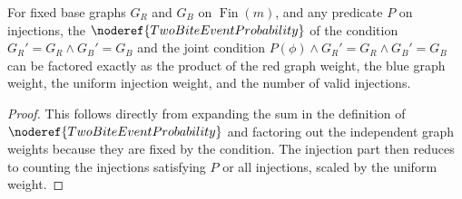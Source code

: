 \begin{helper}[TwoBiteFixedGraphsConditionalInjectionBridge]
\label{helper:TwoBiteFixedGraphsConditionalInjectionBridge}
For fixed base graphs \(G_R\) and \(G_B\) on \(\operatorname{Fin}(m)\), and any predicate \(P\) on injections, the \(\noderef{TwoBiteEventProbability}\) of the condition \(G_R'=G_R \land G_B'=G_B\) and the joint condition \(P(\phi) \land G_R'=G_R \land G_B'=G_B\) can be factored exactly as the product of the red graph weight, the blue graph weight, the uniform injection weight, and the number of valid injections.
\end{helper}

\begin{proof}
This follows directly from expanding the sum in the definition of \(\noderef{TwoBiteEventProbability}\) and factoring out the independent graph weights because they are fixed by the condition. The injection part then reduces to counting the injections satisfying \(P\) or all injections, scaled by the uniform weight.
\end{proof}
